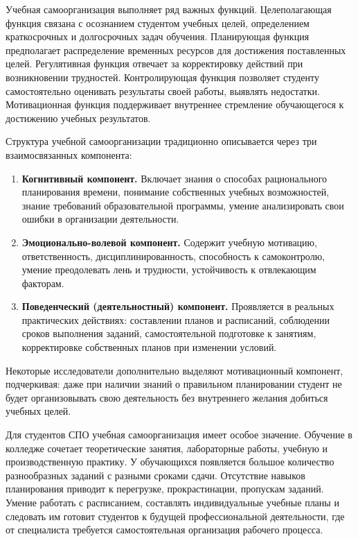 \documentclass[14pt,a4paper]{article}
\begin{document}
Учебная самоорганизация выполняет ряд важных функций. Целеполагающая функция связана с осознанием студентом учебных целей, определением краткосрочных и долгосрочных задач обучения. Планирующая функция предполагает распределение временных ресурсов для достижения поставленных целей. Регулятивная функция отвечает за корректировку действий при возникновении трудностей. Контролирующая функция позволяет студенту самостоятельно оценивать результаты своей работы, выявлять недостатки. Мотивационная функция поддерживает внутреннее стремление обучающегося к достижению учебных результатов.

Структура учебной самоорганизации традиционно описывается через три взаимосвязанных компонента:
\begin{enumerate}
    \item \textbf{Когнитивный компонент.} Включает знания о способах рационального планирования времени, понимание собственных учебных возможностей, знание требований образовательной программы, умение анализировать свои ошибки в организации деятельности.
    \item \textbf{Эмоционально-волевой компонент.} Содержит учебную мотивацию, ответственность, дисциплинированность, способность к самоконтролю, умение преодолевать лень и трудности, устойчивость к отвлекающим факторам.
    \item \textbf{Поведенческий (деятельностный) компонент.} Проявляется в реальных практических действиях: составлении планов и расписаний, соблюдении сроков выполнения заданий, самостоятельной подготовке к занятиям, корректировке собственных планов при изменении условий.
\end{enumerate}

Некоторые исследователи дополнительно выделяют мотивационный компонент, подчеркивая: даже при наличии знаний о правильном планировании студент не будет организовывать свою деятельность без внутреннего желания добиться учебных целей.

Для студентов СПО учебная самоорганизация имеет особое значение. Обучение в колледже сочетает теоретические занятия, лабораторные работы, учебную и производственную практику. У обучающихся появляется большое количество разнообразных заданий с разными сроками сдачи. Отсутствие навыков планирования приводит к перегрузке, прокрастинации, пропускам заданий. Умение работать с расписанием, составлять индивидуальные учебные планы и следовать им готовит студентов к будущей профессиональной деятельности, где от специалиста требуется самостоятельная организация рабочего процесса.
\end{document}
